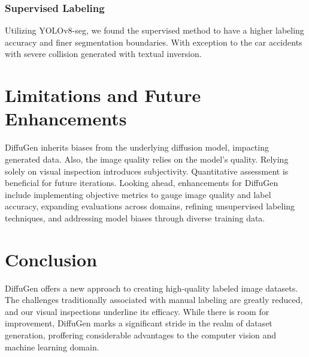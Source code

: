 \documentclass{article}
\begin{document}
\subsubsection{Supervised Labeling}
Utilizing YOLOv8-seg, we found the supervised method to have a higher labeling accuracy and finer segmentation boundaries. With exception to the car accidents with severe collision generated with textual inversion. 

\section{Limitations and Future Enhancements}
DiffuGen inherits biases from the underlying diffusion model, impacting generated data. Also, the image quality relies on the model's quality. Relying solely on visual inspection introduces subjectivity. Quantitative assessment is beneficial for future iterations.
Looking ahead, enhancements for DiffuGen include implementing objective metrics to gauge image quality and label accuracy, expanding evaluations across domains, refining unsupervised labeling techniques, and addressing model biases through diverse training data.

\section{Conclusion}
DiffuGen offers a new approach to creating high-quality labeled image datasets. The challenges traditionally associated with manual labeling are greatly reduced, and our visual inspections underline its efficacy. While there is room for improvement, DiffuGen marks a significant stride in the realm of dataset generation, proffering considerable advantages to the computer vision and machine learning domain.
\end{document}
